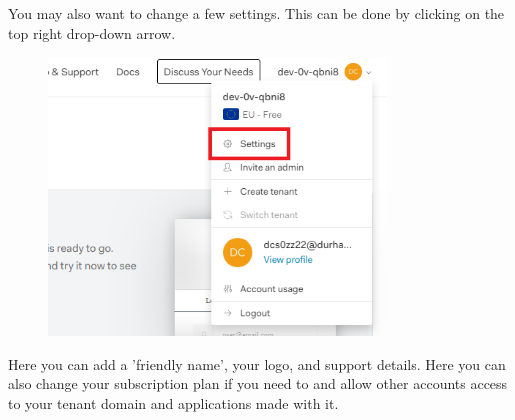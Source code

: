 \documentclass[12pt]{article}
\begin{document}
\noindent
You may also want to change a few settings. This can be done by clicking on the top right drop-down arrow.
\begin{figure}[H]
    \centering
    \includegraphics[width=0.8\textwidth]{auth0/settings.png}
\end{figure}
\noindent
Here you can add a 'friendly name', your logo, and support details. Here you can also change your subscription plan if you need to and allow other accounts access to your tenant domain and applications made with it.
\end{document}
